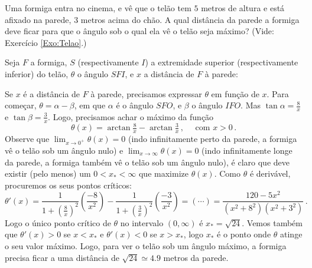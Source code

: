 \begin{exo}\label{Exo:TelaoBIS}
Uma formiga entra no cinema, e vê que 
o telão tem $5$ metros de altura e está afixado na parede, $3$ metros acima do
chão.
A qual distância da parede a formiga deve ficar para que o ângulo sob o qual
ela vê o telão seja máximo? (Vide: Exercício \ref{Exo:Telao}.)
\begin{sol}
Seja $F$ a formiga, $S$ (respectivamente $I$) a extremidade superior
(respectivamente inferior) do telão, $\theta$ o ângulo $SFI$, e $x$ a distância
de $F$ à parede:
\begin{center}
\begin{bmlimage}\end{bmlimage}
\end{center}
Se $x$ é a distância de $F$ à parede, precisamos expressar $\theta$ em função
de $x$. Para começar, $\theta=\alpha-\beta$, em que $\alpha$ é o ângulo $SFO$,
e $\beta$ o ângulo $IFO$. Mas $\tan \alpha =\frac{8}{x}$ e $\tan
\beta=\frac{3}{x}$. Logo, precisamos achar o máximo da função 
$$
\theta(x)=\arctan\tfrac{8}{x}-\arctan \tfrac{3}{x}\,,\quad \text{ com }x>0\,.
$$
Observe que $\lim_{x\to 0^+}\theta(x)=0$ (indo infinitamente perto da
parede, a formiga vê o telão sob um ângulo nulo) e $\lim_{x\to
\infty}\theta(x)=0$ (indo infinitamente longe da parede, a
formiga também vê o telão sob um ângulo nulo), é claro que deve existir (pelo
menos) um $0<x_*<\infty$ que maximize $\theta(x)$. Como $\theta$ é derivável,
procuremos os seus pontos críticos: 
$$
\theta'(x)=\frac{1}{1+(\tfrac8x)^2}(\frac{-8}{x^2})
-\frac{1}{1+(\tfrac3x)^2}(\frac{-3}{x^2})=(\cdots)=\frac{120-5x^2}{
(x^2+8^2)(x^2+3^2)}\,.
$$
Logo o único ponto crítico de $\theta$ no intervalo $(0,\infty)$ é
$x_*=\sqrt{24}$. Vemos também que $\theta'(x)>0$ se $x<x_*$ e 
$\theta'(x)<0$ se $x>x_*$, logo $x_*$ é o ponto onde $\theta$ atinge o seu
valor máximo. 
Logo, para ver o telão sob um ângulo máximo, a formiga precisa ficar a uma
distância de $\sqrt{24}\simeq 4.9$ metros da parede.
\end{sol}
\end{exo}


